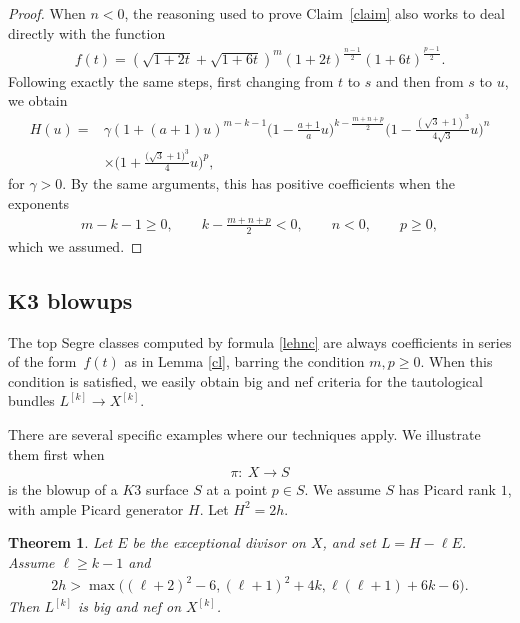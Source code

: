 \documentclass[10pt,a4paper]{amsart}
\numberwithin{equation}{section}
\newtheorem{Theorem}{Theorem}[section]
\begin{document}
\begin{proof}
When $n<0$, the reasoning used to prove Claim~\ref{claim} also works to deal directly with the function
\begin{gather*}
f(t)=\left(\sqrt{1+2t}+\sqrt{1+6t}\right)^m {(1+2t)}^{\frac{n-1}{2}} (1+6t)^{\frac{p-1}{2}}.
\end{gather*}
Following exactly the same steps, first changing from $t$ to $s$ and then from $s$ to $u$, we obtain
\begin{align*}
H(u)={}&\gamma (1+(a+1)u)^{m-k-1} \biggl(1-\frac{a+1}{a}u\biggr)^{k-\frac{m+n+p}{2}} \biggl(1-\frac{(\sqrt{3}+1)^3}{4\sqrt{3}}u\biggr)^{n}
\\
&\times \biggl(1+\frac{\big(\sqrt{3}+1\big)^3}{4}u\biggr)^p,
\end{align*}
for $\gamma>0$. By the same arguments, this has positive coefficients when the exponents
\begin{gather*}
m-k-1\geq 0, \qquad k-\frac{m+n+p}{2}<0, \qquad n<0, \qquad p\geq 0,
\end{gather*}
which we assumed.
\end{proof}


\subsection[K3 blowups]{$\boldsymbol{K3}$ blowups}
The top Segre classes computed by formula \eqref{lehnc} are always coefficients in series of the form~$f(t)$ as in Lemma \ref{cl}, barring the condition $m, p\geq 0$. When this condition is satisfied, we easily obtain big and nef criteria for the tautological bundles $L^{[k]}\to X^{[k]}$.

There are several specific examples where our techniques apply. We illustrate them first when
\begin{gather*}
\pi\colon\ X\to S
\end{gather*}
is the blowup of a $K3$ surface $S$ at a point $p\in S$. We assume
$S$ has Picard rank $1$, with ample Picard generator $H$. Let $H^2=2h$.

\begin{Theorem}\label{blok}
Let $E$ be the exceptional divisor on $X$, and set $L=H-\ell E$. Assume $\ell\geq k-1$ and
\begin{gather*}
2h>\max \bigl((\ell+2)^2-6, (\ell+1)^2+4k, \ell(\ell+1)+6k-6\bigr).
\end{gather*}
Then $L^{[k]}$ is big and nef on $X^{[k]}$.
\end{Theorem}
\end{document}
